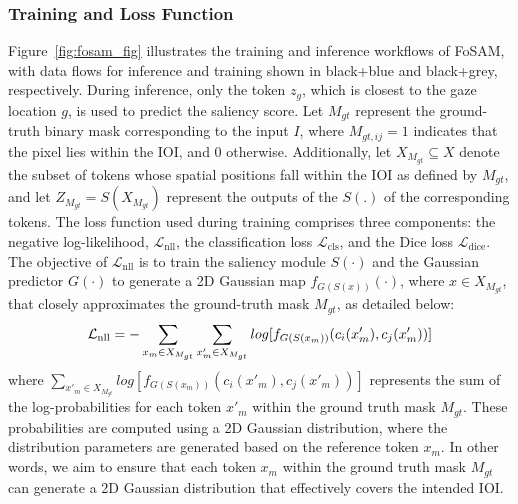 \documentclass{article}
\begin{document}
\subsubsection{Training and Loss Function}
\label{sec:training}

Figure~\ref{fig:fosam_fig} illustrates the training and inference workflows of FoSAM, with data flows for inference and training shown in black+blue and black+grey, respectively. During inference, only the token $z_g$, which is closest to the gaze location $g$, is used to predict the saliency score. Let $M_{gt}$ represent the ground-truth binary mask corresponding to the input $I$, where $M_{gt, ij} = 1$ indicates that the pixel lies within the IOI, and 0 otherwise. Additionally, let $X_{M_{gt}} \subseteq X$ denote the subset of tokens whose spatial positions fall within the IOI as defined by $M_{gt}$, and let $Z_{M_{gt}} = S(X_{M_{gt}})$ represent the outputs of the $S(.)$ of the corresponding tokens.
The loss function used during training comprises three components: the negative log-likelihood, \(\mathcal{L}_{\mathrm{nll}}\), the classification loss \(\mathcal{L}_{\mathrm{cls}}\), and the Dice loss \(\mathcal{L}_{\mathrm{dice}}\). The objective of $\mathcal{L}_{\mathrm{nll}}$ is to train the saliency module $S(\cdot)$ and the Gaussian predictor $G(\cdot)$ to generate a 2D Gaussian map $f_{G(S(x))}(\cdot)$, where $x \in X_{M_{gt}}$, that closely approximates the ground-truth mask $M_{gt}$, as detailed below:
\begin{equation}
\label{eqn:loss1}
\small
\mathcal{L}_{\mathrm{nll}} = -\sum_{x_{m}\in X_{M_{gt}}} \sum_{x'_{m}\in X_{M_{gt}}} log [f_{G(S(x_{m}))}(c_{i}(x'_{m}), c_{j}(x'_{m}))]
\end{equation}
where $\sum_{x'_{m}\in X_{M_{gt}}} log [f_{G(S(x_{m}))}(c_{i}(x'_{m}), c_{j}(x'_{m}))]$ represents the sum of the log-probabilities for each token $x'_{m}$ within the ground truth mask $M_{gt}$. These probabilities are computed using a 2D Gaussian distribution, where the distribution parameters are generated based on the reference token $x_{m}$. In other words, we aim to ensure that each token $x_{m}$ within the ground truth mask $M_{gt}$ can generate a 2D Gaussian distribution that effectively covers the intended IOI.
\end{document}
